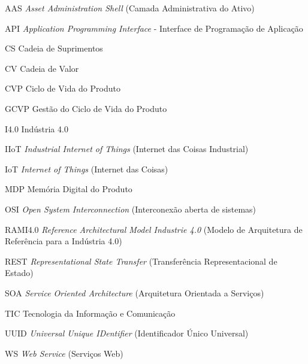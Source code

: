\begin{siglas}
	\item[AAS] \textit{Asset Administration Shell} (Camada Administrativa do Ativo)
	\item[API] \textit{Application Programming Interface} - Interface de Programação de Aplicação
	\item[CS] Cadeia de Suprimentos
	\item[CV] Cadeia de Valor
	\item[CVP] Ciclo de Vida do Produto
	\item[GCVP] Gestão do Ciclo de Vida do Produto
	\item[I4.0] Indústria 4.0
	\item[IIoT] \textit{Industrial Internet of Things} (Internet das Coisas Industrial)
	\item[IoT] \textit{Internet of Things} (Internet das Coisas)
	\item[MDP] Memória Digital do Produto
	\item[OSI] \textit{Open System Interconnection} (Interconexão aberta de sistemas)
	\item[RAMI4.0] \textit{Reference Architectural Model Industrie 4.0} (Modelo de Arquitetura de Referência para a Indústria 4.0)
	\item[REST] \textit{Representational State Transfer} (Transferência Representacional de Estado)
	\item[SOA] \textit{Service Oriented Architecture} (Arquitetura Orientada a Serviços)
  	\item[TIC] Tecnologia da Informação e Comunicação
  	\item[UUID] \textit{Universal Unique IDentifier} (Identificador Único Universal)
  	\item[WS] \textit{Web Service} (Serviços Web)
\end{siglas}

\tableofcontents*
\cleardoublepage
